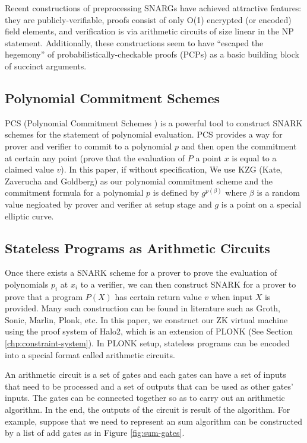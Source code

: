 Recent constructions of preprocessing SNARGs have achieved attractive features: they are publicly-verifiable, proofs consist of only O(1) encrypted (or encoded) field elements, and verification is via arithmetic circuits of size linear in the NP statement. Additionally, these constructions seem to have “escaped the hegemony” of probabilistically-checkable proofs (PCPs) as a basic building block of succinct arguments.


\subsection{Polynomial Commitment Schemes}
PCS (Polynomial Commitment Schemes \cite{boneh2020halo-pcs,boneh2020efficient-pcs,kate2010polynomial-pcs}) is a powerful tool to construct SNARK schemes for the statement of polynomial evaluation. PCS provides a way for prover and verifier to commit to a polynomial $p$ and then open the commitment at certain any point (prove that the evaluation of $P$ a point $x$ is equal to a claimed value $v$). In this paper, if without specification, We use KZG (Kate, Zaverucha and Goldberg) as our polynomial commitment scheme and the commitment formula for a polynomial $p$ is defined by $g^{p(\beta)}$ where $\beta$ is a random value negioated by prover and verifier at setup stage and $g$ is a point on a special elliptic curve.

\subsection{Stateless Programs as Arithmetic Circuits}
\label{chp:arith-circuits}
Once there exists a SNARK scheme for a prover to prove the evaluation of polynomials $p_i$ at $x_i$ to a verifier, we can then construct SNARK for a prover to prove that a program $P(X)$ has certain return value $v$ when input $X$ is provided. Many such construction can be found in literature such as Groth, Sonic, Marlin, Plonk, etc. In this paper, we construct our ZK virtual machine using the proof system of Halo2, which is an extension of PLONK (See Section \ref{chp:constraint-system}). In PLONK setup, stateless programs can be encoded into a special format called arithmetic circuits.

An arithmetic circuit is a set of gates and each gates can have a set of inputs that need to be processed and a set of outputs that can be used as other gates' inputs. The gates can be connected together so as to carry out an arithmetic algorithm. In the end, the outputs of the circuit is result of the algorithm. For example, suppose that we need to represent an sum algorithm can be constructed by a list of add gates as in Figure \ref{fig:sum-gates}.

